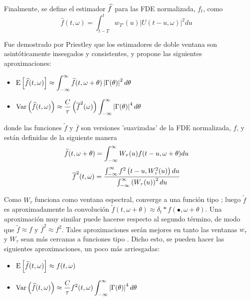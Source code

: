 Finalmente, se define el estimador $\widehat{ f }$ para las FDE normalizada, $f_t$, como
\begin{equation*}
\widehat{f}(t,\omega) = \int_{t-T}^{t} w_{T'}(u) \lvert U(t-u,\omega) \lvert^{2} du
\label{estimador_doble_ventana}
\end{equation*}

Fue demostrado por Priestley \cite{Priestley65} que los estimadores de doble ventana son 
asintóticamente insesgados y consistentes, y propone las siguientes aproximaciones:
\begin{itemize}
\item $\displaystyle
\mathrm{E}\left[ \widehat{ f }(t,\omega) \right] \approx 
\int_{-\infty}^{\infty} \widetilde{f}(t,\omega+\theta) \left| \Gamma(\theta) \right|^{2} d\theta$
\item $\displaystyle
\mathrm{Var}\left( \widehat{ f }(t,\omega) \right) \approx \frac{C}{\tau} \left( \overline{f}^{2}(\omega) \right)
\int_{-\infty}^{\infty} \left| \Gamma(\theta) \right|^{4} d\theta $
\end{itemize}

donde las funciones $\widetilde{f}$ y $\overline{f}$ son versiones 'suavizadas' de la FDE 
normalizada, $f$, y están definidas de la siguiente manera
\begin{equation*}
\widetilde{f}(t,\omega+\theta) = 
\int_{-\infty}^{\infty} W_{\tau}(u) f(t-u,\omega+\theta) du
\end{equation*}
\begin{equation*}
\overline{f}^{2} (t,\omega) =
\frac{\int_{-\infty}^{\infty} f^{2}\left(t-u,W_{\tau}^{2}(u)\right) du}
{\int_{-\infty}^{\infty} \left( W_{\tau}(u) \right)^{2} du}
\end{equation*}

Como $W_{\tau}$ funciona como ventana espectral, converge a una 
función tipo \dirac; luego $\widetilde{f}$ es aproximadamente la convolución 
$\widetilde{f}(t,\omega+\theta) \approx \delta_t \ast f(\bullet,\omega+\theta)$. 
Una aproximación muy similar 
puede hacerse respecto al segundo término, de modo que $\widetilde{f}\approx f$ y 
$\overline{f}^{2}\approx f^{2}$.
Tales aproximaciones serán mejores en tanto las ventanas $w_{\tau}$ y $W_{\tau}$ sean más 
cercanas a funciones tipo \dirac.
Dicho esto, se pueden hacer las siguientes aproximaciones, un poco más arriesgadas:
\begin{itemize}
\item $\displaystyle \mathrm{E}\left[ \widehat{ f }(t,\omega) \right] \approx f(t,\omega)$
\item $\displaystyle \mathrm{Var}\left( \widehat{ f }(t,\omega) \right) \approx 
\frac{C}{\tau} f^{2}(t,\omega) \int_{-\infty}^{\infty} \left| \Gamma (\theta) \right|^{4} d\theta$
\end{itemize}

